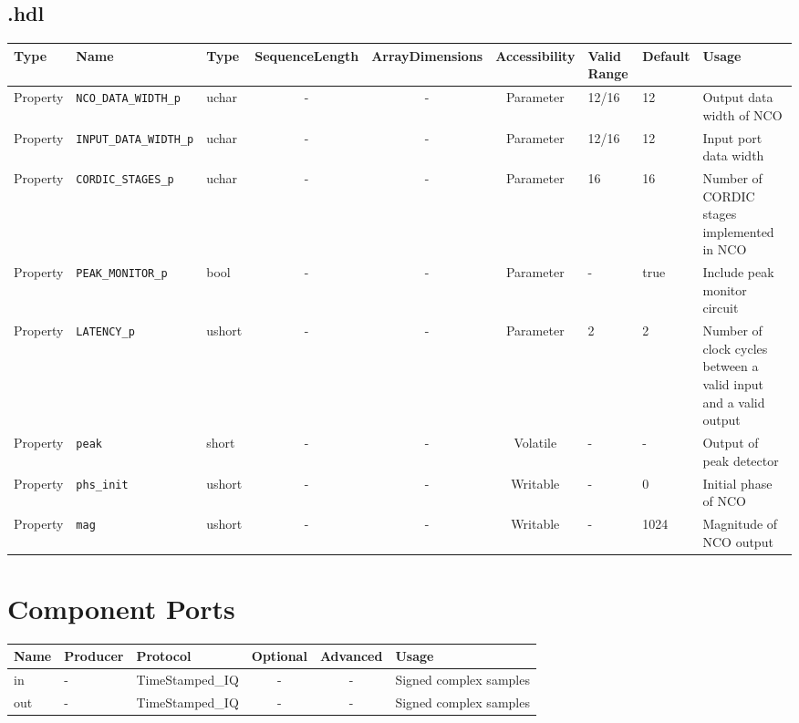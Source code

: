 \begin{landscape}
	\subsection*{\comp.hdl}
	\begin{scriptsize}
		\begin{tabular}{|p{1.5cm}|p{2.5cm}|p{1cm}|c|c|c|p{2cm}|p{1cm}|p{5cm}|}
			\hline
			\rowcolor{blue}
			Type     & Name                      	& Type  	& SequenceLength & ArrayDimensions & Accessibility	& Valid Range 	& Default & Usage\\
			\hline
			Property & \verb+NCO_DATA_WIDTH_p+		& uchar 	& -              & -               & Parameter		& 12/16       	& 12      & Output data width of NCO\\
			\hline
			Property & \verb+INPUT_DATA_WIDTH_p+	& uchar 	& -              & -               & Parameter		& 12/16       	& 12      & Input port data width\\
			\hline
			Property & \verb+CORDIC_STAGES_p+    	& uchar 	& -              & -               & Parameter		& 16          	& 16      & Number of CORDIC stages implemented in NCO\\
			\hline
			Property & \verb+PEAK_MONITOR_p+     	& bool  	& -              & -               & Parameter		& -				& true    & Include peak monitor circuit\\
			\hline
			Property & \verb+LATENCY_p+     	  	& ushort	& -              & -               & Parameter		& 2				& 2		  & Number of clock cycles between a valid input and a valid output\\
			\hline
			Property & \verb+peak+            		& short 	& -              & -               & Volatile		& -				& -       & Output of peak detector\\
			\hline
			Property & \verb+phs_init+    			& ushort 	& -              & -               & Writable 		& -           	& 0       & Initial phase of NCO\\
			\hline
			Property & \verb+mag+         			& ushort 	& -              & -               & Writable 		& -           	& 1024    & Magnitude of NCO output\\
			\hline
		\end{tabular}
	\end{scriptsize}

	\section*{Component Ports}
	\begin{scriptsize}
		\begin{tabular}{|M{2cm}|M{1.5cm}|M{4cm}|c|c|M{9cm}|}
			\hline
			\rowcolor{blue}
			Name & Producer & Protocol         & Optional	& Advanced & Usage\\
			\hline
			in   & -		& TimeStamped\_IQ	& -			& -        & Signed complex samples\\
			\hline
			out  & -		& TimeStamped\_IQ	& -			& -        & Signed complex samples\\
			\hline
		\end{tabular}
	\end{scriptsize}


\end{landscape}
